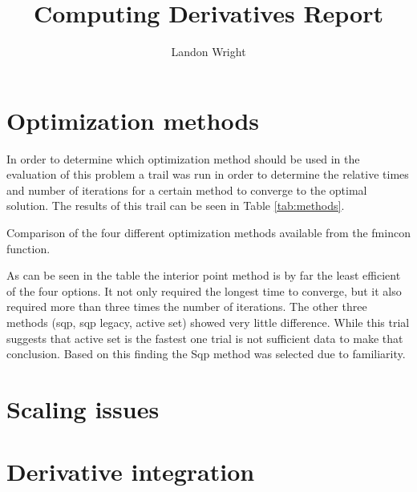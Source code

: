 \documentclass{article}
\begin{document}
\singlespacing
\title{Computing Derivatives Report}
\author{Landon Wright}
\maketitle

\section{Optimization methods}
In order to determine which optimization method should be used in the evaluation of this problem a trail was run in order to determine the relative times and number of iterations for a certain method to converge to the optimal solution.  The results of this trail can be seen in Table \ref{tab:methods}.
\begin{table}[h]
	\begin{center}
		\caption{Comparison of the four different optimization methods available from the fmincon function.}
		\label{tab:methods}
		\noindent{}
	\end{center}
\end{table}

As can be seen in the table the interior point method is by far the least efficient of the four options. It not only required the longest time to converge, but it also required more than three times the number of iterations.  The other three methods (sqp, sqp legacy, active set) showed very little difference.  While this trial suggests that active set is the fastest one trial is not sufficient data to make that conclusion.  Based on this finding the Sqp method was selected due to familiarity.


\section{Scaling issues}

\section{Derivative integration}
\end{document}
